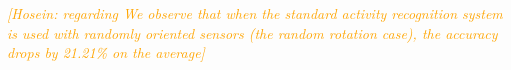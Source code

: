 \documentclass[journal,article,submit,moreauthors,pdftex]{Definitions/mdpi}
\newcommand{\hosein}[1]{\textcolor{orange}{{\it [Hosein: #1]}}}
\begin{document}
\hosein{regarding We observe that when the standard activity recognition system is used with randomly oriented sensors (the random rotation case), the accuracy drops by 21.21\% on the average}
\end{document}
